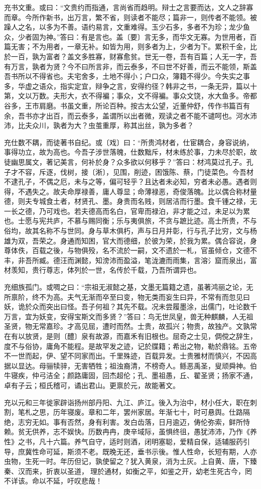 \documentclass[]{article}
\begin{document}
充书文重。或曰：``文贵约而指通，言尚省而趋明。辩士之言要而达，文人之辞寡而章。今所作新书，出万言，繁不省，则读者不能尽；篇非一，则传者不能领。被躁人之名，以多为不善。语约易言，文重难得。玉少石多，多者不为珍；龙少鱼众，少者固为神。''答曰：有是言也。盖〔要〕言无多，而华文无寡。为世用者，百篇无害；不为用者，一章无补。如皆为用，则多者为上，少者为下。累积千金，比於一百，孰为富者？盖文多胜寡，财寡愈贫。世无一卷，吾有百篇；人无一字，吾有万言，孰者为贤？今不曰所言非，而云泰多，不曰世不好善，而云不能领，斯盖吾书所以不得省也。夫宅舍多，土地不得小；户口众，簿籍不得少。今失实之事多，华虚之语众，指实定宜，辩争之言，安得约径？韩非之书，一条无异，篇以十第，文以万数。夫形大，衣不得褊；事众，文不得褊。事众文饶，水大鱼多。帝都谷多，王市肩磨。书虽文重，所论百种。按古太公望，近董仲舒，传作书篇百有余，吾书亦才出百，而云泰多，盖谓所以出者微，观读之者不能不谴呵也。河水沛沛，比夫众川，孰者为大？虫茧重厚，称其出丝，孰为多者？

充仕数不耦，而徒著书自纪。或〔戏〕曰：``所贵鸿材者，仕宦耦合，身容说纳，事得功立，故为高也。今吾子涉世落魄，仕数黜斥，材未练於事，力未尽於职，故徒幽思属文，著记美言，何补於身？众多欲以何移乎？''答曰：材鸿莫过孔子。孔子才不容，斥逐，伐树，接〔淅〕，见围，削迹，困饿陈、蔡，门徒菜色。今吾材不逮孔子，不偶之厄，未与之等，偏可轻乎？且达者未必知，穷者未必愚。遇者则得，不遇失之。故夫命厚禄善，庸人尊显；命薄禄恶，奇俊落魄。比以偶合称材量德，则夫专城食土者，材贤孔、墨。身贵而名贱，则居洁而行墨。食千锺之禄，无一长之德，乃可戏也。若夫德高而名白，官卑而禄泊，非才能之过，未足以为累也。士愿与宪共庐，不慕与赐同衡；乐与夷俱旅，不贪与蹠比迹。高士所贵，不与俗均，故其名称不与世同。身与草木俱朽，声与日月并彰，行与孔子比穷，文与杨雄为双，吾荣之。身通而知困，官大而德细，於彼为荣，於我为累。偶合容说，身尊体佚，百载之後，与物俱殁，名不流於一嗣，文不遗於一札，官虽倾仓，文德不丰，非吾所臧。德汪而渊懿，知滂沛而盈溢，笔泷漉而雨集，言溶氵窟而泉出，富材羡知，贵行尊志，体列於一世，名传於千载，乃吾所谓异也。

充细族孤门。或啁之曰：``宗祖无淑懿之基，文墨无篇籍之遗，虽著鸿丽之论，无所禀阶，终不为高。夫气无渐而卒至曰变，物无类而妄生曰异，不常有而忽见曰妖，诡於众而突出曰怪。吾子何祖？其先不载。况未尝履墨涂，出儒门，吐论数千万言，宜为妖变，安得宝斯文而多贤？''答曰：鸟无世凤皇，兽无种麒麟，人无祖圣贤，物无常嘉珍。才高见屈，遭时而然。士贵，故孤兴；物贵，故独产。文孰常在有以放贤，是则〔醴〕泉有故源，而嘉禾有旧根也。屈奇之士见，倜傥之辞生，度不与俗协，庸角不能程。是故罕发之迹，记於牒籍；希出之物，勒於鼎铭。五帝不一世而起，伊、望不同家而出。千里殊迹，百载异发。士贵雅材而慎兴，不因高据以显达。母骊犊骍，无害牺牲；祖浊裔清，不榜奇人。鲧恶禹圣，叟顽舜神。伯牛寝疾，仲弓洁全；颜路庸固，回杰超伦；孔、墨祖愚，丘、翟圣贤；扬家不通，卓有子云；桓氏稽可，谲出君山。更禀於元，故能著文。

充以元和三年徙家辟诣扬州部丹阳、九江、庐江。後入为治中，材小任大，职在刺割，笔札之思，历年寝废。章和二年，罢州家居。年渐七十，时可悬舆。仕路隔绝，志穷无如。事有否然，身有利害。发白齿落，日月逾迈，俦伦弥索，鲜所恃赖。贫无供养，志不娱快。历数冉冉，庚辛域际，虽惧终徂，愚犹沛沛，乃作《养性》之书，凡十六篇。养气自守，适时则酒，闭明塞聪，爱精自保，适辅服药引导，庶冀性命可延，斯须不老。既晚无还，垂书示後。惟人性命，长短有期，人亦虫物，生死一时。年历但记，孰使留之？犹入黄泉，消为土灰。上自黄、唐，下臻秦、汉而来，折衷以圣道，理於通材，如衡之平，如鉴之开，幼老生死古今，罔不详该。命以不延，吁叹悲哉！
\end{document}
